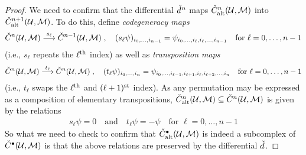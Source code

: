 \documentclass[a4paper,parskip=half,numbers=enddot, DIV=12]{scrreprt}
\begin{document}
	\begin{proof}
		We need to confirm that the differential $\check{d}\hspace{0.06125em}^n$ maps $\check{C}_{\mathrm{alt}}^n(\mathcal{U},\mathcal{M})$ into $\check{C}_{\mathrm{alt}}^{n+1}(\mathcal{U},\mathcal{M})$. To do this, define \emph{codegeneracy maps} 
		\begin{align*}
			\check{C}^n(\Uu,\Mm)\morphism[s_\ell]\check{C}^{n-1}(\Uu,\Mm)\;,\quad (s_\ell\psi)_{i_0,\ldots,i_{n-1}}=\psi_{i_0,\ldots,i_\ell,i_\ell,\ldots,i_{n-1}}\quad\text{for }\ell=0,\ldots,n-1
		\end{align*}
		(i.e., $s_\ell$ repeats the $\ell^{\text{th}}$ index) as well as \emph{transposition maps}
		\begin{align*}
			\check{C}^n(\Uu,\Mm)\morphism[t_\ell]\check{C}^n(\Uu,\Mm)\;,\quad (t_\ell\psi)_{i_0,\ldots,i_n}=\psi_{i_0,\ldots,i_{\ell-1},i_{\ell+1},i_\ell,i_{\ell+2},\ldots,i_{n}}\quad\text{for }\ell=0,\ldots,n-1
		\end{align*}
		(i.e., $t_\ell$ swaps the $\ell^{\text{th}}$ and $(\ell+1)^{\text{st}}$ index). As any permutation may be expressed as a composition of elementary transpositions, $\check{C}_{\mathrm{alt}}^n(\mathcal{U},\mathcal{M})\subseteq\check{C}^n(\mathcal{U},\mathcal{M})$ is given by the relations
		\begin{align*}
			s_\ell\psi=0\quad\text{and}\quad t_\ell\psi=-\psi\quad\text{for }\ell=0,\ldots,n-1
		\end{align*}
		So what we need to check to confirm that $\check{C}_{\mathrm{alt}}^\bullet (\mathcal{U},\mathcal{M})$ is indeed a subcomplex of $\check{C}^\bullet (\mathcal{U},\mathcal{M})$ is that the above relations are preserved by the differential $\check{d}\hspace{0.06125em}$.
		

\end{proof}
\end{document}
